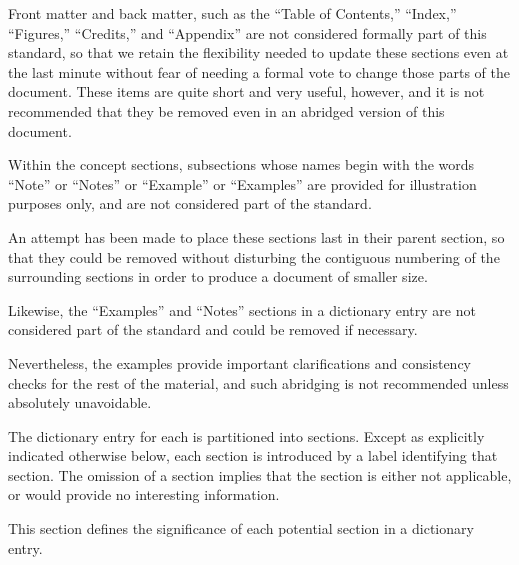 \endlist

\endsubSection%



Front matter and back matter, such as the ``Table of Contents,'' 
``Index,'' ``Figures,'' ``Credits,'' and ``Appendix'' are not considered formally 
part of this standard, so that we retain the flexibility needed to update
these sections even at the last minute without fear of needing a formal 
vote to change those parts of the document.  These items are quite short 
and very useful, however, and it is not recommended that they be removed 
even in an abridged version of this document.

Within the concept sections, subsections whose names begin with 
the words ``Note'' or ``Notes'' or ``Example'' or ``Examples'' 
are provided for illustration purposes only, and are not considered
part of the standard.

An attempt has been made to place these sections last in their parent section,
so that they could be removed without disturbing the contiguous numbering of the 
surrounding sections in order to produce a document of smaller size.

Likewise, the ``Examples'' and ``Notes'' sections in a dictionary entry
are not considered part of the standard and could be removed if necessary.

Nevertheless, the examples provide important clarifications and consistency 
checks for the rest of the material, and such abridging is not recommended
unless absolutely unavoidable.

\endsubsection%


The dictionary entry for each  is partitioned into
sections.  Except as explicitly indicated otherwise below, each section
is introduced by a label identifying that section.  The omission of a
section implies that the section is either not applicable, or would
provide no interesting information.

This section defines the significance of each potential section in a
dictionary entry.

